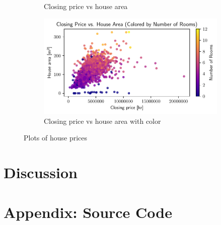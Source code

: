 \documentclass[a4paper]{article}
\begin{document}
\begin{figure}
\begin{subfigure}[b]{\textwidth}
      \caption{Closing price vs house area}
      \label{fig:closing_price_house_ares}
  \end{subfigure}
  \vfill
  \begin{subfigure}[c]{\textwidth}
      \centering
      \includegraphics[width=\textwidth]{closing_price_house_ares_color.pdf}
      \caption{Closing price vs house area with color}
      \label{fig:closing_price_house_ares_color}
  \end{subfigure}
     \caption{Plots of house prices}
     \label{fig:house_plots}
\end{figure}


\newpage

\section*{Discussion}

\newpage


\printbibliography

\section*{Appendix: Source Code}




\end{document}
